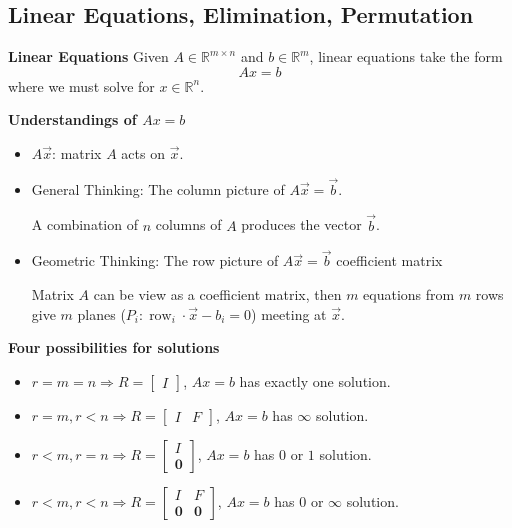 \documentclass[13pt]{article}
\theoremstyle{definition}
\theoremstyle{remark}
\begin{document}
\begin{multicols}{2}
\section{Linear Equations, Elimination, Permutation}
\textbf{Linear Equations}
Given $A \in \mathbb{R}^{m \times n}$ and $b \in \mathbb{R}^{m}$, linear equations take the form
\[
A x=b
\]
where we must solve for $x \in \mathbb{R}^{n}$. 

\textbf{Understandings of $Ax = b$}
\begin{itemize}
    \item $A \vec{x}$: matrix $A$ acts on $\vec{x}$.
        \item General Thinking: The column picture of $A \vec{x}=\vec{b}$.
        
        A combination of $n$ columns of $A$ produces the vector $\vec{b}$.
        
        \item Geometric Thinking: The row picture of $A \vec{x}=\vec{b}$ coefficient matrix 
        
        Matrix $A$ can be view as a coefficient matrix, then $m$ equations from $m$ rows give $m$ planes ($P_i: \operatorname{row}_i \cdot \vec{x}-b_i=0$) meeting at $\vec{x}$.  
\end{itemize}

\textbf{Four possibilities for solutions}
\begin{itemize}
    \item $r=m=n \Longrightarrow R = \begin{bmatrix}
        I
    \end{bmatrix}$,  $A x=b$ has exactly one solution. 
  \item $r=m, r<n \Longrightarrow R = \begin{bmatrix}
        I & F
    \end{bmatrix}$,  $A x=b$ has $\infty$ solution. 
    \item $r<m, r=n \Longrightarrow R = \begin{bmatrix}
        I \\
        \bm{0}
    \end{bmatrix}$,  $A x=b$ has $0$ or $1$ solution. 
  
  \item $r<m, r<n \Longrightarrow R = \begin{bmatrix}
        I & F\\
        \bm{0} & \bm{0}
    \end{bmatrix}$,  $A x=b$ has $0$ or $\infty$ solution. 


\end{itemize}
\end{multicols}
\end{document}
